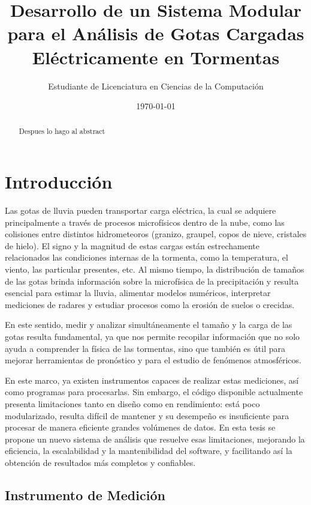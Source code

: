 \documentclass[12pt,a4paper]{article}
\title{\textbf{Desarrollo de un Sistema Modular para el Análisis de Gotas Cargadas Eléctricamente en Tormentas}}
\author{Estudiante de Licenciatura en Ciencias de la Computación}
\date{\today}
\begin{document}
\maketitle

\begin{abstract}
    Despues lo hago al abstract
\end{abstract}

\tableofcontents
\newpage

\section{Introducción}

Las gotas de lluvia pueden transportar carga eléctrica, la cual se adquiere principalmente a través de procesos microfísicos dentro de la nube, como las colisiones entre distintos hidrometeoros (granizo, graupel, copos de nieve, cristales de hielo). El signo y la magnitud de estas cargas están estrechamente relacionados las condiciones internas de la tormenta, como la temperatura, el viento, las particular presentes, etc. Al mismo tiempo, la distribución de tamaños de las gotas brinda información sobre la microfísica de la precipitación y resulta esencial para estimar la lluvia, alimentar modelos numéricos, interpretar mediciones de radares y estudiar procesos como la erosión de suelos o crecidas.

En este sentido, medir y analizar simultáneamente el tamaño y la carga de las gotas resulta fundamental, ya que nos permite recopilar información que no solo ayuda a comprender la física de las tormentas, sino que también es útil para mejorar herramientas de pronóstico y para el estudio de fenómenos atmosféricos.

En este marco, ya existen instrumentos capaces de realizar estas mediciones, así como programas para procesarlas. Sin embargo, el código disponible actualmente presenta limitaciones tanto en diseño como en rendimiento: está poco modularizado, resulta difícil de mantener y su desempeño es insuficiente para procesar de manera eficiente grandes volúmenes de datos. En esta tesis se propone un nuevo sistema de análisis que resuelve esas limitaciones, mejorando la eficiencia, la escalabilidad y la mantenibilidad del software, y facilitando así la obtención de resultados más completos y confiables.

\subsection{Instrumento de Medición}
\end{document}
